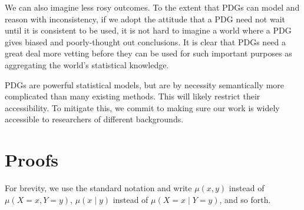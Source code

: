 \documentclass[letterpaper]{article} %
\theoremstyle{plain}
\theoremstyle{definition}
\theoremstyle{remark}
\newif\ifappendix\appendixfalse
\newcommand{\V}{\mathcal V}
\begin{document}
We can also imagine less rosy outcomes. To the extent that PDGs can
model and reason with inconsistency, if we adopt the attitude that a PDG need
not wait until it is consistent to be used, it is not hard to imagine a world
where a PDG gives biased and
poorly-thought out conclusions. It is clear that PDGs need a great deal more
vetting before they can be used for such important purposes as
aggregating the world's statistical knowledge.

PDGs are powerful statistical models, but are by necessity semantically more
complicated than many existing methods. This will likely restrict their
accessibility. To mitigate this, we commit to making sure our work is widely
accessible to researchers of different
backgrounds.
\fi
\ifappendix
\appendix
\clearpage
\onecolumn
%
\section{Proofs} \label{sec:proofs}
		For brevity, we use the standard notation and write $\mu(x, y)$
	instead of $\mu(X \!=\! x, Y \!=\! y)$, $\mu(x \mid y)$ instead of
	$\mu(X \!=\! x\mid Y \!=\! y)$, and so forth.
\end{document}
